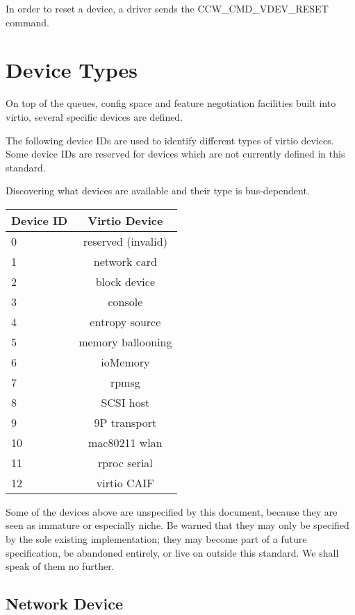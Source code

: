 In order to reset a device, a driver sends the
CCW_CMD_VDEV_RESET command.


\chapter{Device Types}\label{sec:Device Types}

On top of the queues, config space and feature negotiation facilities
built into virtio, several specific devices are defined.

The following device IDs are used to identify different types of virtio
devices.  Some device IDs are reserved for devices which are not currently
defined in this standard.

Discovering what devices are available and their type is bus-dependent.

\begin{tabular} { |l|c| }
\hline
Device ID  &  Virtio Device    \\
\hline \hline
0          & reserved (invalid) \\
\hline
1          &   network card     \\
\hline
2          &   block device     \\
\hline
3          &      console       \\
\hline
4          &  entropy source    \\
\hline
5          & memory ballooning  \\
\hline
6          &     ioMemory       \\
\hline
7          &       rpmsg        \\
\hline
8          &     SCSI host      \\
\hline
9          &   9P transport     \\
\hline
10         &   mac80211 wlan    \\
\hline
11         &   rproc serial     \\
\hline
12         &   virtio CAIF      \\
\hline
\end{tabular}

Some of the devices above are unspecified by this document,
because they are seen as immature or especially niche.  Be warned
that they may only be specified by the sole existing implementation;
they may become part of a future specification, be abandoned
entirely, or live on outside this standard.  We shall speak of
them no further.

\section{Network Device}\label{sec:Device Types / Network Device}

